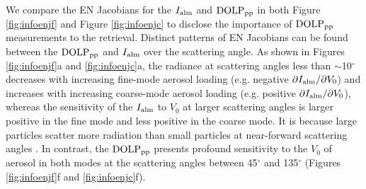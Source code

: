 We compare the EN Jacobians for the $I_\text{alm}$ and $\text{DOLP}_\text{pp}$ in both 
Figure \ref{fig:infoenjf} and Figure \ref{fig:infoenjc} to disclose the 
importance of $\text{DOLP}_\text{pp}$ measurements to the retrieval. Distinct patterns of EN 
Jacobians can be found between the $\text{DOLP}_\text{pp}$ and $I_\text{alm}$ over the
scattering angle. As shown in Figures \ref{fig:infoenjf}a and
\ref{fig:infoenjc}a, the radiance at scattering angles less than
$\sim$10$^\circ$ decreases with increasing fine-mode aerosol loading (e.g.
negative $\partial I_\text{alm}/\partial{V_0}$) and increases with increasing 
coarse-mode aerosol loading (e.g. positive $\partial I_\text{alm}/\partial{V_0}$), 
whereas the sensitivity of the $I_\text{alm}$ to $V_0$ at larger scattering angles is 
larger positive in the fine mode and less positive in the coarse mode. 
It is because large particles scatter more radiation than small particles at 
near-forward scattering angles \citep{vandeHulst81}. In contrast, the $\text{DOLP}_\text{pp}$ 
presents profound sensitivity to the $V_0$ of aerosol in both modes at the 
scattering angles between 45$^\circ$ and 135$^\circ$ (Figures 
\ref{fig:infoenjf}f and \ref{fig:infoenjc}f). 


